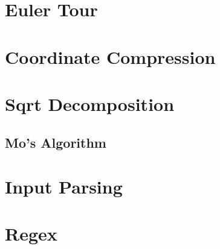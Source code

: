 \documentclass[a4paper,landscape,twocolumn]{article}
\begin{document}

\section{Euler Tour}



\section{Coordinate Compression}



\section{Sqrt Decomposition}

\subsection{Mo's Algorithm}


\section{Input Parsing}



\section{Regex}


\end{document}
